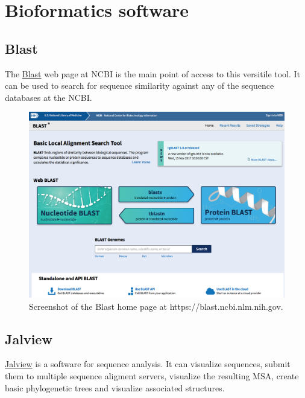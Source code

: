 \documentclass[]{book}
\theoremstyle{definition}
\theoremstyle{definition}
\theoremstyle{definition}
\theoremstyle{remark}
\begin{document}
\section{Bioformatics software}\label{bioformatics-software}

\subsection{Blast}\label{blast-1}

The \href{https://blast.ncbi.nlm.nih.gov}{Blast} web page at NCBI is the
main point of access to this versitile tool. It can be used to search
for sequence similarity against any of the sequence databases at the
NCBI.

\begin{figure}
\includegraphics[width=16.83in]{pic/blast_web} \caption{Screenshot of the Blast home page at https://blast.ncbi.nlm.nih.gov.}\label{fig:blast-web}
\end{figure}

\subsection{Jalview}\label{jalview}

\href{http://www.jalview.org}{Jalview} is a software for sequence
analysis. It can visualize sequences, submit them to multiple sequence
aligment servers, visualize the resulting MSA, create basic phylogenetic
trees and visualize associated structures.
\end{document}

